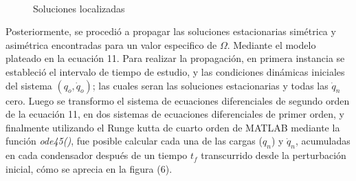 \documentclass[11pt,letterpaper,twocolumn]{article}
\begin{document}
\begin{figure}[http]
\\
\caption{Soluciones localizadas}
\end{figure}
\par 
Posteriormente, se procedió a propagar las soluciones estacionarias simétrica y asimétrica encontradas para un valor especifico de $\Omega$. Mediante el modelo plateado en la ecuación 11. Para realizar la propagación, en primera instancia se estableció el intervalo de tiempo de estudio, y las condiciones dinámicas iniciales del sistema $(q_{o},\dot{q}_{o})$; las cuales seran las soluciones estacionarias y todas las $\dot{q}_{n}$ cero. Luego se transformo el sistema de ecuaciones diferenciales de segundo orden de la ecuación 11, en dos sistemas de ecuaciones diferenciales de primer orden, y finalmente utilizando el Runge kutta de cuarto orden de MATLAB mediante la función \textit{ode45()}, fue posible calcular cada una de las cargas ($q_{n}$) y  $\dot{q}_{n}$,  acumuladas en cada condensador después de un tiempo $t_{f}$ transcurrido desde la perturbación inicial, cómo se aprecia en la figura ($6$).\\
\end{document}
